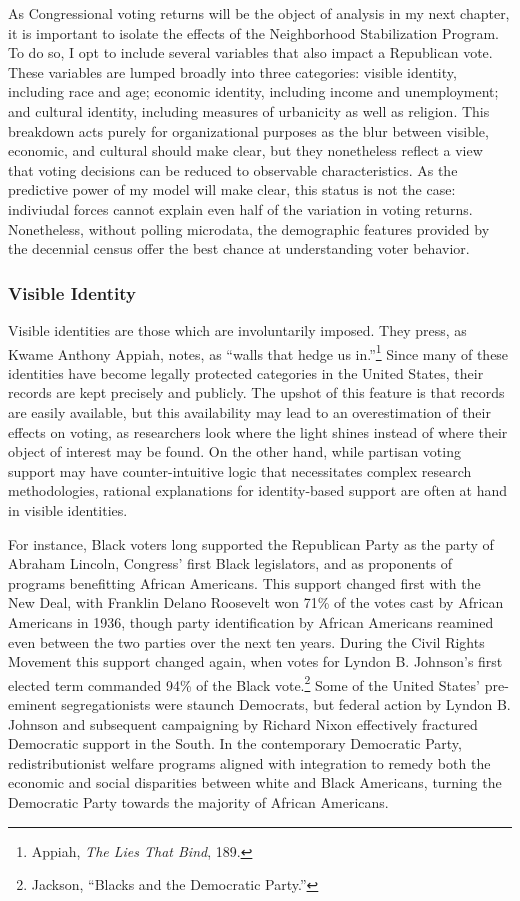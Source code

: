 \documentclass[
]{article}
\begin{document}
As Congressional voting returns will be the object of analysis in my next chapter, it is important to isolate the effects of the Neighborhood Stabilization Program.
To do so, I opt to include several variables that also impact a Republican vote.
These variables are lumped broadly into three categories: visible identity, including race and age; economic identity, including income and unemployment; and cultural identity, including measures of urbanicity as well as religion.
This breakdown acts purely for organizational purposes as the blur between visible, economic, and cultural should make clear, but they nonetheless reflect a view that voting decisions can be reduced to observable characteristics.
As the predictive power of my model will make clear, this status is not the case: indiviudal forces cannot explain even half of the variation in voting returns.
Nonetheless, without polling microdata, the demographic features provided by the decennial census offer the best chance at understanding voter behavior.

\hypertarget{visible-identity}{%
\subsubsection{Visible Identity}\label{visible-identity}}

Visible identities are those which are involuntarily imposed.
They press, as Kwame Anthony Appiah, notes, as ``walls that hedge us in.''\footnote{Appiah, \emph{The Lies That Bind}, 189.}
Since many of these identities have become legally protected categories in the United States, their records are kept precisely and publicly.
The upshot of this feature is that records are easily available, but this availability may lead to an overestimation of their effects on voting, as researchers look where the light shines instead of where their object of interest may be found.
On the other hand, while partisan voting support may have counter-intuitive logic that necessitates complex research methodologies, rational explanations for identity-based support are often at hand in visible identities.

For instance, Black voters long supported the Republican Party as the party of Abraham Lincoln, Congress' first Black legislators, and as proponents of programs benefitting African Americans.
This support changed first with the New Deal, with Franklin Delano Roosevelt won 71\% of the votes cast by African Americans in 1936, though party identification by African Americans reamined even between the two parties over the next ten years.
During the Civil Rights Movement this support changed again, when votes for Lyndon B. Johnson's first elected term commanded 94\% of the Black vote.\footnote{Jackson, ``Blacks and the Democratic Party.''}
Some of the United States' pre-eminent segregationists were staunch Democrats, but federal action by Lyndon B. Johnson and subsequent campaigning by Richard Nixon effectively fractured Democratic support in the South.
In the contemporary Democratic Party, redistributionist welfare programs aligned with integration to remedy both the economic and social disparities between white and Black Americans, turning the Democratic Party towards the majority of African Americans.
\end{document}
